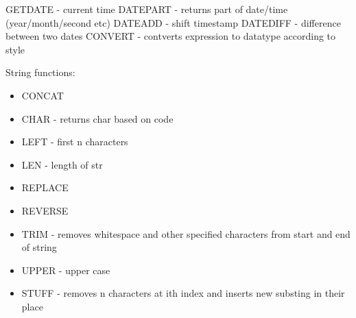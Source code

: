 \documentclass{article}
\begin{document}
    GETDATE - current time
    DATEPART - returns part of date/time (year/month/second etc)
    DATEADD - shift timestamp
    DATEDIFF - difference between two dates
    CONVERT - contverts expression to datatype according to style

    String functions:
    \begin{itemize}
        \item CONCAT
        \item CHAR - returns char based on code
        \item LEFT - first n characters
        \item LEN - length of str
        \item REPLACE
        \item REVERSE
        \item TRIM - removes whitespace and other specified characters from start and end of string
        \item UPPER - upper case
        \item STUFF - removes n characters at ith index and inserts new substing in their place
    \end{itemize}
\end{document}
